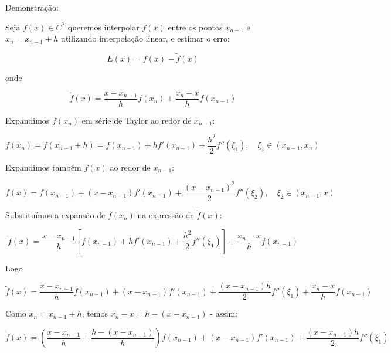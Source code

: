 \documentclass[12pt, a4paper]{article} %
\begin{document}
        Demonstra\c{c}\~ao:

        Seja $f(x) \in C^2$ queremos interpolar $f(x)$ entre os pontos $x_{n-1}$ e $x_n = x_{n-1} + h$ utilizando interpolação linear, e estimar o erro:

        \begin{equation*}
            E(x) = f(x) - \tilde{f}(x)
        \end{equation*}

        onde

        \begin{equation*}
            \tilde{f}(x) = \frac{x - x_{n-1}}{h} f(x_n) + \frac{x_n - x}{h} f(x_{n-1})
        \end{equation*}

        Expandimos $f(x_n)$ em série de Taylor ao redor de $x_{n-1}$:

        \begin{equation*}
            f(x_n) = f(x_{n-1} + h) = f(x_{n-1}) + h f'(x_{n-1}) + \frac{h^2}{2} f''(\xi_1), \quad \xi_1 \in (x_{n-1}, x_n)
        \end{equation*}

        Expandimos também $f(x)$ ao redor de $x_{n-1}$:

        \begin{equation*}
            f(x) = f(x_{n-1}) + (x - x_{n-1}) f'(x_{n-1}) + \frac{(x - x_{n-1})^2}{2} f''(\xi_2), \quad \xi_2 \in (x_{n-1}, x)
        \end{equation*}

        Substituímos a expansão de $f(x_n)$ na expressão de $\tilde{f}(x)$:

        \begin{equation*}
            \tilde{f}(x) = \frac{x - x_{n-1}}{h} \left[ f(x_{n-1}) + h f'(x_{n-1}) + \frac{h^2}{2} f''(\xi_1) \right] + \frac{x_n - x}{h} f(x_{n-1})
        \end{equation*}

        Logo

        \begin{equation*}
            \tilde{f}(x) = \frac{x - x_{n-1}}{h} f(x_{n-1}) + (x - x_{n-1}) f'(x_{n-1}) + \frac{(x - x_{n-1}) h}{2} f''(\xi_1) + \frac{x_n - x}{h} f(x_{n-1})
        \end{equation*}

        Como $x_n = x_{n-1} + h$, temos $x_n - x = h - (x - x_{n-1})$ - assim:

        \begin{equation*}
            \tilde{f}(x) = \left( \frac{x - x_{n-1}}{h} + \frac{h - (x - x_{n-1})}{h} \right) f(x_{n-1}) + (x - x_{n-1}) f'(x_{n-1}) + \frac{(x - x_{n-1}) h}{2} f''(\xi_1)
        \end{equation*}
\end{document}
